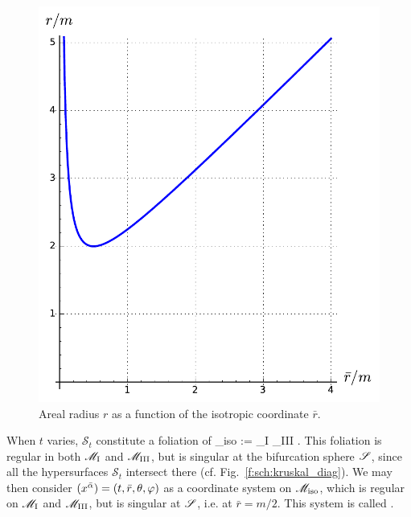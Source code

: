 \begin{figure}
\centerline{\includegraphics[height=0.4\textheight]{max_r_riso.pdf}}
\caption[]{\label{f:max:r_riso} \footnotesize
Areal radius $r$ as a function of the isotropic coordinate $\bar{r}$.}
\end{figure}

When $t$ varies, $\mathcal{S}_t$ constitute a foliation of
\be
    \M_{\rm iso} := \M_{\rm I} \cup \Sp \cup \M_{\rm III} .
\ee
This foliation is regular in both $\mathscr{M}_{\rm I}$ and $\mathscr{M}_{\rm III}$, but is
singular at the bifurcation sphere $\mathscr{S}$, since all
the hypersurfaces $\mathcal{S}_t$ intersect there (cf. Fig.~\ref{f:sch:kruskal_diag}).
We may then consider $(x^{\bar{\alpha}}) = (t,\bar{r},\theta,\varphi)$ as a coordinate system
on $\mathscr{M}_{\rm iso}$, which is regular on $\mathscr{M}_{\rm I}$ and $\mathscr{M}_{\rm III}$,
but is singular at $\mathscr{S}$, i.e. at $\bar{r}=m/2$. This system is called
.


